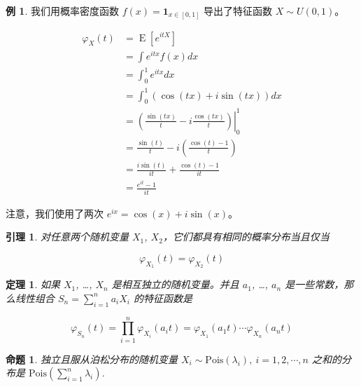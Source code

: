 \documentclass[
  12pt,
]{krantz}
\newtheorem{theorem}{定理}[chapter]
\newtheorem{lemma}{引理}[chapter]
\newtheorem{proposition}{命题}[chapter]
\theoremstyle{definition}
\theoremstyle{definition}
\newtheorem{example}{例}[chapter]
\theoremstyle{definition}
\theoremstyle{definition}
\theoremstyle{remark}
\begin{document}
\begin{example}
我们用概率密度函数 \(f(x)=\mathbf{1}_{x \in [0,1]}\) 导出了特征函数 \(X\sim U(0,1)\)。

\begin{equation*}
\begin{split}
\varphi _{X}(t) &= \operatorname {E} \left[e^{itX}\right]\\
 & =\int e^{itx}f(x)dx\\
 & =\int_{0}^{1}e^{itx}dx\\
 & =\int_{0}^{1}\left(\cos(tx)+i\sin(tx)\right)dx\\
 & =\left.\left(\frac{\sin(tx)}{t}-i\frac{\cos(tx)}{t}\right)\right|_{0}^{1}\\
 & =\frac{\sin(t)}{t}-i\left(\frac{\cos(t)-1}{t}\right)\\
 & =\frac{i\sin(t)}{it}+\frac{\cos(t)-1}{it}\\
 & =\frac{e^{it}-1}{it}
\end{split}
\end{equation*}

注意，我们使用了两次 \(e^{ix}=\cos(x)+i\sin(x)\)。
\end{example}

\begin{lemma}
\protect\hypertarget{lem:chf-pdf}{}\label{lem:chf-pdf}对任意两个随机变量 \(X_1\), \(X_2\)，它们都具有相同的概率分布当且仅当

\[\varphi _{X_1}(t)=\varphi _{X_2}(t)\]
\end{lemma}

\begin{theorem}
\protect\hypertarget{thm:chf-sum}{}\label{thm:chf-sum}如果 \(X_1\), \ldots, \(X_n\) 是相互独立的随机变量。并且 \(a_1\), \ldots, \(a_n\) 是一些常数，那么线性组合 \(S_n=\sum_{i=1}^na_iX_i\) 的特征函数是

\[\varphi _{S_{n}}(t)=\prod_{i=1}^n\varphi _{X_i}(a_{i}t)=\varphi _{X_{1}}(a_{1}t)\cdots \varphi _{X_{n}}(a_{n}t)\]
\end{theorem}

\begin{proposition}
独立且服从泊松分布的随机变量 \(X_i \sim \mathrm{Pois}(\lambda_i),\: i=1,2,\cdots,n\) 之和的分布是 \(\mathrm{Pois}(\sum_{i=1}^n\lambda_i)\).
\end{proposition}
\end{document}
